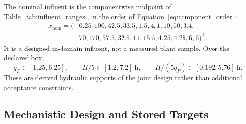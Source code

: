 \documentclass[a4paper,fleqn]{cas-sc}
\begin{document}
The nominal influent is the componentwise midpoint of Table~\ref{tab:influent_ranges}, in the order of Equation~\eqref{eq:component_order}:
\begin{equation}
\label{eq:nominal_influent}
\begin{split}
x_{\mathrm{nom}}=(&0.25,100,42.5,33.5,1.5,4,1,10,50,3.4,\\
&70,170,57.5,32.5,11,15.5,4.25,4.25,6,6)^\top.
\end{split}
\end{equation}
It is a designed in-domain influent, not a measured plant sample. Over the declared box,
\begin{equation}
q_P\in[1.25,6.25],\qquad H/5\in[1.2,7.2]\ \mathrm{h},\qquad
H/(5q_P)\in[0.192,5.76]\ \mathrm{h}.
\end{equation}
These are derived hydraulic supports of the joint design rather than additional acceptance constraints.

\subsection{Mechanistic Design and Stored Targets}
\end{document}
